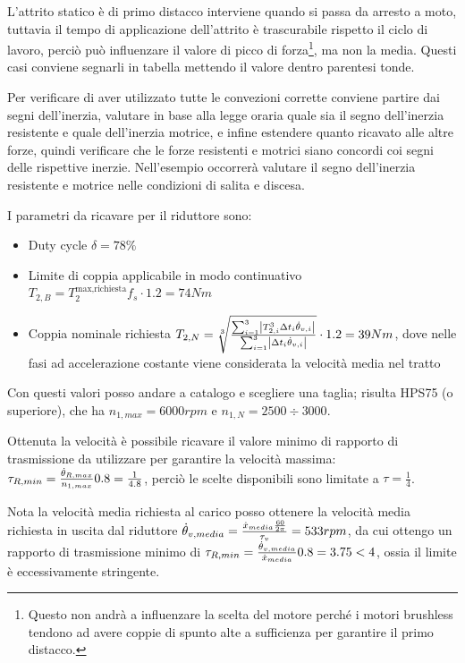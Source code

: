 L'attrito statico è di primo distacco interviene quando si passa da arresto a moto, tuttavia il tempo di applicazione dell'attrito è trascurabile rispetto il ciclo di lavoro, perciò può influenzare il valore di picco di forza\footnote{Questo non andrà a influenzare la scelta del motore perché i motori brushless tendono ad avere coppie di spunto alte a sufficienza per garantire il primo distacco.}, ma non la media. Questi casi conviene segnarli in tabella mettendo il valore dentro parentesi tonde.

Per verificare di aver utilizzato tutte le convezioni corrette conviene partire dai segni dell'inerzia, valutare in base alla legge oraria quale sia il segno dell'inerzia resistente e quale dell'inerzia motrice, e infine estendere quanto ricavato alle altre forze, quindi verificare che le forze resistenti e motrici siano concordi coi segni delle rispettive inerzie.
Nell'esempio occorrerà valutare il segno dell'inerzia resistente e motrice nelle condizioni di salita e discesa.

I parametri da ricavare per il riduttore sono:
\begin{itemize}
    \item Duty cycle \(\delta = 78\% \)
    \item Limite di coppia applicabile in modo continuativo \(T_{2,B} = T_2^\text{max,richiesta} f_s \cdot 1.2 = 74 Nm \)
    \item Coppia nominale richiesta \(T_{2,N} = \sqrt[3]{\frac{\sum^3_{i=1}\left|T_{2,i}^3\Delta t_i \dot{\theta}_{v,i}\right|}{\sum^3_{i=1} \left|\Delta t_i \dot{\theta}_{v,i}\right| }} \cdot 1.2 = 39 Nm\), dove nelle fasi ad accelerazione costante viene considerata la velocità media nel tratto
\end{itemize}
Con questi valori posso andare a catalogo e scegliere una taglia; risulta HPS75 (o superiore), che ha \(n_{1,max} = 6000 rpm\) e \(n_{1,N} = 2500\div 3000\).

Ottenuta la velocità è possibile ricavare il valore minimo di rapporto di trasmissione da utilizzare per garantire la velocità massima: \(\tau_{R,min} = \frac{\dot{\theta}_{R,max}}{n_{1,max}} 0.8 = \frac{1}{4.8}\), perciò le scelte disponibili sono limitate a \(\tau=\frac{1}{4}\).

Nota la velocità media richiesta al carico posso ottenere la velocità media richiesta in uscita dal riduttore \(\dot{\theta}_{v,media} = \frac{\dot{x}_{media}\frac{60}{2\pi}}{\tau_v} = 533 rpm\), da cui ottengo un rapporto di trasmissione minimo di \(\tau_{R,min} = \frac{\dot{\theta}_{v,media}}{\dot{x}_{media}} 0.8 = 3.75 < 4\), ossia il limite è eccessivamente stringente.

